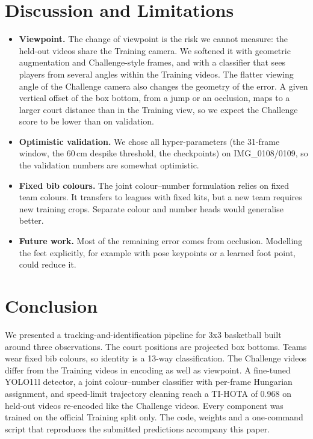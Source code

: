 \documentclass[11pt,a4paper]{article}
\begin{document}
\section{Discussion and Limitations}
\begin{itemize}
\item \textbf{Viewpoint.} The change of viewpoint is the risk we cannot measure: the held-out videos
share the Training camera. We softened it with geometric augmentation and Challenge-style frames, and
with a classifier that sees players from several angles within the Training videos. The flatter
viewing angle of the Challenge camera also changes the geometry of the error. A given vertical offset of the box
bottom, from a jump or an occlusion, maps to a larger court distance than in the Training view, so we
expect the Challenge score to be lower than on validation.
\item \textbf{Optimistic validation.} We chose all hyper-parameters (the 31-frame window, the 60\,cm
despike threshold, the checkpoints) on IMG\_0108/0109, so the validation numbers are somewhat optimistic.
\item \textbf{Fixed bib colours.} The joint colour--number formulation relies on fixed team colours. It
transfers to leagues with fixed kits, but a new team requires new training crops. Separate colour and
number heads would generalise better.
\item \textbf{Future work.} Most of the remaining error comes from occlusion. Modelling the feet
explicitly, for example with pose keypoints or a learned foot point, could reduce it.
\end{itemize}

\section{Conclusion}
We presented a tracking-and-identification pipeline for 3x3 basketball built around three observations.
The court positions are projected box bottoms. Teams wear fixed bib colours, so identity is a 13-way
classification. The Challenge videos differ from the Training videos in encoding as well as viewpoint.
A fine-tuned YOLO11l detector, a joint colour--number classifier with per-frame Hungarian assignment,
and speed-limit trajectory cleaning reach a TI-HOTA of 0.968 on held-out videos re-encoded like the
Challenge videos. Every component was trained on the official Training split only. The code, weights and
a one-command script that reproduces the submitted predictions accompany this paper.
\end{document}
